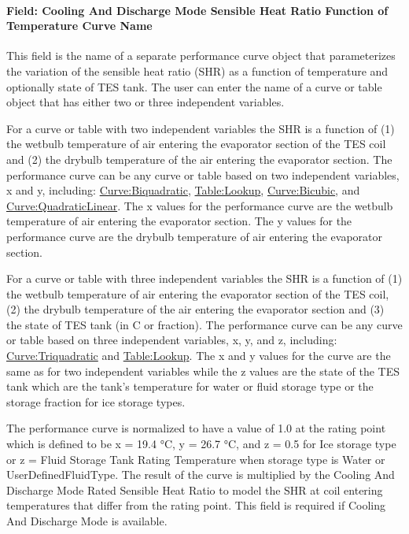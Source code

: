 \paragraph{Field: Cooling And Discharge Mode Sensible Heat Ratio Function of Temperature Curve Name}\label{field-cooling-and-discharge-mode-sensible-heat-ratio-function-of-temperature-curve-name}

This field is the name of a separate performance curve object that parameterizes the variation of the sensible heat ratio (SHR) as a function of temperature and optionally state of TES tank. The user can enter the name of a curve or table object that has either two or three independent variables.

For a curve or table with two independent variables the SHR is a function of (1) the wetbulb temperature of air entering the evaporator section of the TES coil and (2) the drybulb temperature of the air entering the evaporator section. The performance curve can be any curve or table based on two independent variables, x and y, including: \hyperref[curvebiquadratic]{Curve:Biquadratic}, \hyperref[tablelookup]{Table:Lookup}, \hyperref[curvebicubic]{Curve:Bicubic}, and \hyperref[curvequadraticlinear]{Curve:QuadraticLinear}. The x values for the performance curve are the wetbulb temperature of air entering the evaporator section. The y values for the performance curve are the drybulb temperature of air entering the evaporator section.

For a curve or table with three independent variables the SHR is a function of (1) the wetbulb temperature of air entering the evaporator section of the TES coil, (2) the drybulb temperature of the air entering the evaporator section and (3) the state of TES tank (in C or fraction). The performance curve can be any curve or table based on three independent variables, x, y, and z, including: \hyperref[curvetriquadratic]{Curve:Triquadratic} and \hyperref[tablelookup]{Table:Lookup}. The x and y values for the curve are the same as for two independent variables while the z values are the state of the TES tank which are the tank's temperature for water or fluid storage type or the storage fraction for ice storage types.

The performance curve is normalized to have a value of 1.0 at the rating point which is defined to be x = 19.4 °C, y = 26.7 °C, and z = 0.5 for Ice storage type or z = Fluid Storage Tank Rating Temperature when storage type is Water or UserDefinedFluidType. The result of the curve is multiplied by the Cooling And Discharge Mode Rated Sensible Heat Ratio to model the SHR at coil entering temperatures that differ from the rating point. This field is required if Cooling And Discharge Mode is available.

